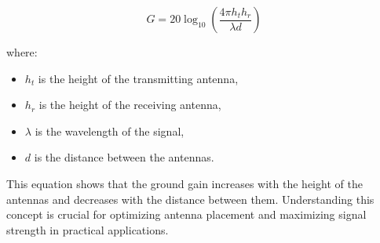 \[
G = 20 \log_{10} \left( \frac{4 \pi h_t h_r}{\lambda d} \right)
\]

where:
\begin{itemize}
    \item \( h_t \) is the height of the transmitting antenna,
    \item \( h_r \) is the height of the receiving antenna,
    \item \( \lambda \) is the wavelength of the signal,
    \item \( d \) is the distance between the antennas.
\end{itemize}

This equation shows that the ground gain increases with the height of the antennas and decreases with the distance between them. Understanding this concept is crucial for optimizing antenna placement and maximizing signal strength in practical applications.

